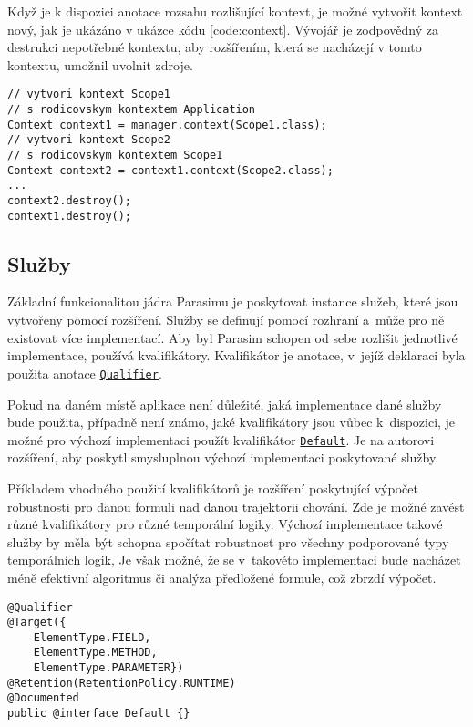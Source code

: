 Když je k dispozici anotace rozsahu rozlišující kontext, je možné  vytvořit kontext
nový, jak je ukázáno v ukázce kódu \ref{code:context}. Vývojář je zodpovědný za destrukci
nepotřebné kontextu, aby roz\-ší\-ře\-ním, která se na\-chá\-ze\-jí v tomto kontextu, umožnil uvolnit zdroje.

\begin{lstlisting}[label={code:context}, caption={Vytvoření kontextu}, style=Java]
// vytvori kontext Scope1
// s rodicovskym kontextem Application
Context context1 = manager.context(Scope1.class); 
// vytvori kontext Scope2
// s rodicovskym kontextem Scope1
Context context2 = context1.context(Scope2.class);
...
context2.destroy();
context1.destroy();
\end{lstlisting}

\subsection{Služby}

Základní funkcionalitou jádra Parasimu je poskytovat instance služeb, kte\-ré jsou
vytvořeny pomocí rozšíření. Služby se definují pomocí rozhraní a~mů\-že pro ně existovat
více implementací. Aby byl Parasim schopen od sebe roz\-li\-šit jednotlivé implementace,
používá kvalifikátory. Kva\-li\-fi\-ká\-tor je anotace, v~je\-jíž deklaraci byla použita anotace
\href{https://github.com/sybila/parasim/blob/2.0.0.Final/core/src/main/java/org/sybila/parasim/core/annotation/Qualifier.java}{\texttt{Qualifier}}.

Pokud na daném místě aplikace není důležité, jaká implementace dané služby bude použita,
případně není známo, jaké kvalifikátory jsou vůbec k~dis\-po\-zi\-ci, je možné pro výchozí implementaci použít kvalifikátor
\href{https://github.com/sybila/parasim/blob/2.0.0.Final/core/src/main/java/org/sybila/parasim/core/annotation/Default.java}{\texttt{Default}}. Je na autorovi rozšíření, aby poskytl smysluplnou výchozí implementaci
poskytované služby.

Příkladem vhodného použití kvalifikátorů je rozšíření poskytující
vý\-počet robustnosti pro danou formuli nad danou trajektorii chování. Zde je možné zavést
různé kvalifikátory pro různé temporální logiky. Výchozí implementace takové služby
by měla být schopna spočítat robustnost pro všechny podporované typy temporálních logik,
Je však možné, že se v~takovéto implementaci bude nacházet méně efektivní algoritmus
či analýza předložené formule, což zbrzdí výpočet.

\begin{lstlisting}[label={code:qualifier}, caption={Kvalifikátor}, style=Java]
@Qualifier
@Target({
	ElementType.FIELD,
	ElementType.METHOD,
	ElementType.PARAMETER})
@Retention(RetentionPolicy.RUNTIME)
@Documented
public @interface Default {}
\end{lstlisting}

